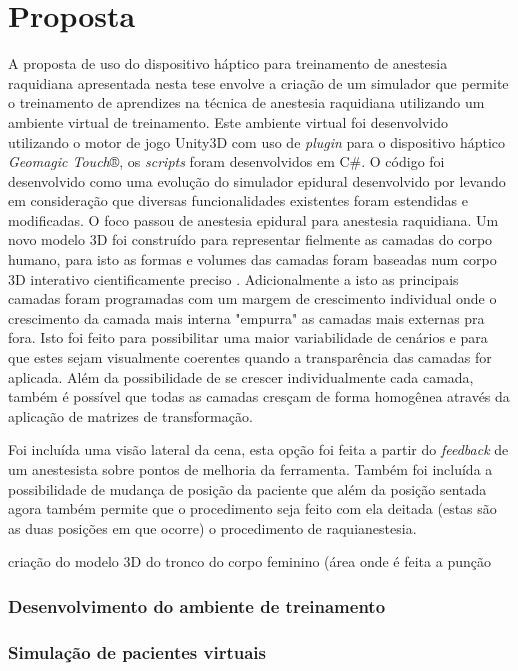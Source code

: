 \chapter{Proposta} \label{cap:cap4}

A proposta de uso do dispositivo háptico para treinamento de anestesia raquidiana apresentada nesta tese envolve a criação de um simulador que permite o treinamento de aprendizes na técnica de anestesia raquidiana utilizando um ambiente virtual de treinamento.
Este ambiente virtual foi desenvolvido utilizando o motor de jogo Unity3D com uso de \textit{plugin} para o dispositivo háptico \textit{Geomagic Touch}®, os \textit{scripts} foram desenvolvidos em C#. O código foi desenvolvido como uma evolução do simulador epidural desenvolvido por \textcite{Brazil2017} levando em consideração que diversas funcionalidades existentes foram estendidas e modificadas. O foco passou de anestesia epidural para anestesia raquidiana. Um novo modelo 3D foi construído para representar fielmente as camadas do corpo humano, para isto as formas e volumes das camadas foram baseadas num corpo 3D interativo cientificamente preciso \cite{BioDigitalInc2019}. Adicionalmente a isto as principais camadas foram programadas com um margem de crescimento individual onde o crescimento da camada mais interna "empurra" as camadas mais externas pra fora. Isto foi feito para possibilitar uma maior variabilidade de cenários e para que estes sejam visualmente coerentes quando a transparência das camadas for aplicada. Além da possibilidade de se crescer individualmente cada camada, também é possível que todas as camadas cresçam de forma homogênea através da aplicação de matrizes de transformação. 

Foi incluída uma visão lateral da cena, esta opção foi feita a partir do \textit{feedback} de um anestesista sobre pontos de melhoria da ferramenta. Também foi incluída a possibilidade de mudança de posição da paciente que além da posição sentada agora também permite que o procedimento seja feito com ela deitada (estas são as duas posições em que ocorre) o procedimento de raquianestesia.   

criação do modelo 3D do tronco do corpo feminino (área onde é feita a punção  

\subsection {Desenvolvimento do ambiente de treinamento} 

\subsection {Simulação de pacientes virtuais}
